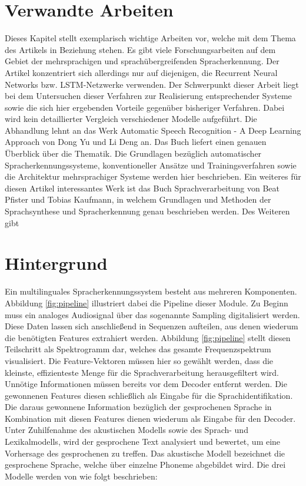 \section{Verwandte Arbeiten}
Dieses Kapitel stellt exemplarisch wichtige Arbeiten vor, welche mit dem Thema des Artikels in Beziehung stehen. Es gibt viele Forschungsarbeiten auf dem Gebiet der mehrsprachigen und sprachübergreifenden Spracherkennung. Der Artikel konzentriert sich allerdings nur auf diejenigen, die Recurrent Neural Networks bzw. LSTM-Netzwerke verwenden. Der Schwerpunkt dieser Arbeit liegt bei dem Untersuchen dieser Verfahren zur Realisierung entsprechender Systeme sowie die sich hier ergebenden Vorteile gegenüber bisheriger Verfahren. Dabei wird kein detaillierter Vergleich verschiedener Modelle aufgeführt.  
Die Abhandlung lehnt an das Werk Automatic Speech Recognition - A Deep Learning Approach von Dong Yu und Li Deng \cite{Yu.2014} an. Das Buch liefert einen genauen Überblick über die Thematik. Die Grundlagen bezüglich automatischer Spracherkennungssysteme, konventioneller Ansätze und Trainingsverfahren sowie die Architektur mehrsprachiger Systeme werden hier beschrieben.
Ein weiteres für diesen Artikel interessantes Werk ist das Buch Sprachverarbeitung von Beat Pfister und Tobias Kaufmann, in welchem Grundlagen und Methoden der Sprachsynthese und Spracherkennung genau beschrieben werden.  
Des Weiteren gibt    


\section{Hintergrund}
Ein multilinguales Spracherkennungssystem besteht aus mehreren Komponenten. Abbildung \ref{fig:pipeline} illustriert dabei die Pipeline dieser Module. Zu Beginn muss ein analoges Audiosignal über das sogenannte Sampling digitalisiert werden. Diese Daten lassen sich anschließend in Sequenzen aufteilen, aus denen wiederum die benötigten Features extrahiert werden. Abbildung \ref{fig:pipeline} stellt diesen Teilschritt als Spektrogramm dar, welches das gesamte Frequenzspektrum visualisiert. Die Feature-Vektoren müssen hier so gewählt werden, dass die kleinste, effizienteste Menge für die Sprachverarbeitung herausgefiltert wird. Unnötige Informationen müssen bereits vor dem Decoder entfernt werden. Die gewonnenen Features diesen schließlich als Eingabe für die Sprachidentifikation. Die daraus gewonnene Information bezüglich der gesprochenen Sprache in Kombination mit diesen Features dienen wiederum als Eingabe für den Decoder. Unter Zuhilfenahme des akustischen Modells sowie des Sprach- und Lexikalmodells, wird der gesprochene Text analysiert und bewertet, um eine Vorhersage des gesprochenen zu treffen. Das akustische Modell bezeichnet die gesprochene Sprache, welche über einzelne Phoneme abgebildet wird. 
  Die drei Modelle werden von \cite{Tom.2016} wie folgt beschrieben:


